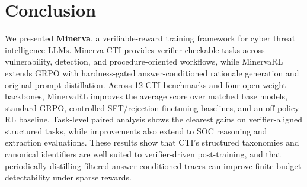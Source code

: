\section{Conclusion}

We presented \textbf{Minerva}, a verifiable-reward training framework for cyber threat intelligence LLMs. Minerva-CTI provides verifier-checkable tasks across vulnerability, detection, and procedure-oriented workflows, while MinervaRL extends GRPO with hardness-gated answer-conditioned rationale generation and original-prompt distillation. Across 12 CTI benchmarks and four open-weight backbones, MinervaRL improves the average score over matched base models, standard GRPO, controlled SFT/rejection-finetuning baselines, and an off-policy RL baseline. Task-level paired analysis shows the clearest gains on verifier-aligned structured tasks, while improvements also extend to SOC reasoning and extraction evaluations. These results show that CTI's structured taxonomies and canonical identifiers are well suited to verifier-driven post-training, and that periodically distilling filtered answer-conditioned traces can improve finite-budget detectability under sparse rewards.
